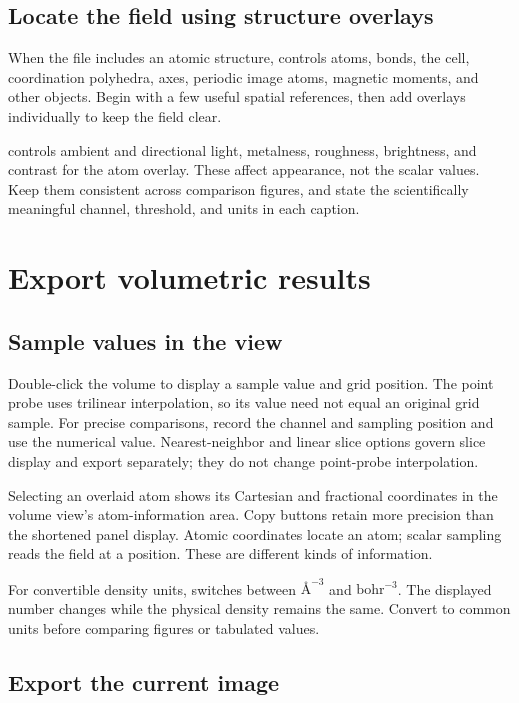 \subsection{Locate the field using structure overlays}

When the file includes an atomic structure,  controls atoms, bonds, the cell, coordination polyhedra, axes, periodic image atoms, magnetic moments, and other objects. Begin with a few useful spatial references, then add overlays individually to keep the field clear.

 controls ambient and directional light, metalness, roughness, brightness, and contrast for the atom overlay. These affect appearance, not the scalar values. Keep them consistent across comparison figures, and state the scientifically meaningful channel, threshold, and units in each caption.

\section{Export volumetric results}

\subsection{Sample values in the view}

Double-click the volume to display a sample value and grid position. The point probe uses trilinear interpolation, so its value need not equal an original grid sample. For precise comparisons, record the channel and sampling position and use the numerical value. Nearest-neighbor and linear slice options govern slice display and export separately; they do not change point-probe interpolation.

Selecting an overlaid atom shows its Cartesian and fractional coordinates in the volume view's atom-information area. Copy buttons retain more precision than the shortened panel display. Atomic coordinates locate an atom; scalar sampling reads the field at a position. These are different kinds of information.

For convertible density units,  switches between $\text{\AA}^{-3}$ and $\mathrm{bohr}^{-3}$. The displayed number changes while the physical density remains the same. Convert to common units before comparing figures or tabulated values.

\subsection{Export the current image}

